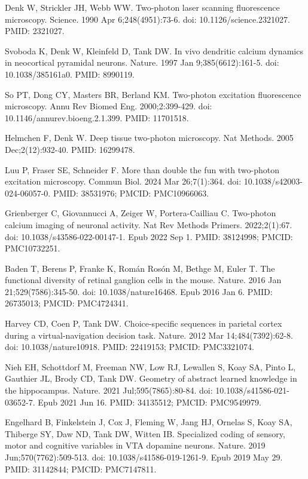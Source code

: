 \documentclass[10pt,letterpaper]{article}
\begin{document}
\begin{thebibliography}{10}

Denk W, Strickler JH, Webb WW. Two-photon laser scanning fluorescence microscopy. Science. 1990 Apr 6;248(4951):73-6. doi: 10.1126/science.2321027. PMID: 2321027.

Svoboda K, Denk W, Kleinfeld D, Tank DW. In vivo dendritic calcium dynamics in neocortical pyramidal neurons. Nature. 1997 Jan 9;385(6612):161-5. doi: 10.1038/385161a0. PMID: 8990119.

So PT, Dong CY, Masters BR, Berland KM. Two-photon excitation fluorescence microscopy. Annu Rev Biomed Eng. 2000;2:399-429. doi: 10.1146/annurev.bioeng.2.1.399. PMID: 11701518.

Helmchen F, Denk W. Deep tissue two-photon microscopy. Nat Methods. 2005 Dec;2(12):932-40. PMID: 16299478.

Luu P, Fraser SE, Schneider F. More than double the fun with two-photon excitation microscopy. Commun Biol. 2024 Mar 26;7(1):364. doi: 10.1038/s42003-024-06057-0. PMID: 38531976; PMCID: PMC10966063.

Grienberger C, Giovannucci A, Zeiger W, Portera-Cailliau C. Two-photon calcium imaging of neuronal activity. Nat Rev Methods Primers. 2022;2(1):67. doi: 10.1038/s43586-022-00147-1. Epub 2022 Sep 1. PMID: 38124998; PMCID: PMC10732251.

Baden T, Berens P, Franke K, Román Rosón M, Bethge M, Euler T. The functional diversity of retinal ganglion cells in the mouse. Nature. 2016 Jan 21;529(7586):345-50. doi: 10.1038/nature16468. Epub 2016 Jan 6. PMID: 26735013; PMCID: PMC4724341.

Harvey CD, Coen P, Tank DW. Choice-specific sequences in parietal cortex during a virtual-navigation decision task. Nature. 2012 Mar 14;484(7392):62-8. doi: 10.1038/nature10918. PMID: 22419153; PMCID: PMC3321074.

Nieh EH, Schottdorf M, Freeman NW, Low RJ, Lewallen S, Koay SA, Pinto L, Gauthier JL, Brody CD, Tank DW. Geometry of abstract learned knowledge in the hippocampus. Nature. 2021 Jul;595(7865):80-84. doi: 10.1038/s41586-021-03652-7. Epub 2021 Jun 16. PMID: 34135512; PMCID: PMC9549979.

Engelhard B, Finkelstein J, Cox J, Fleming W, Jang HJ, Ornelas S, Koay SA, Thiberge SY, Daw ND, Tank DW, Witten IB. Specialized coding of sensory, motor and cognitive variables in VTA dopamine neurons. Nature. 2019 Jun;570(7762):509-513. doi: 10.1038/s41586-019-1261-9. Epub 2019 May 29. PMID: 31142844; PMCID: PMC7147811.


\end{thebibliography}
\end{document}
